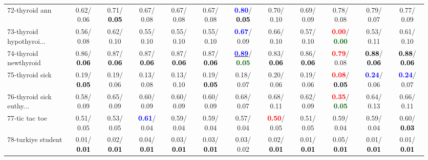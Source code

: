 \begin{table}[h]
\begin{center}
{\begin{tabular}{lc|c|c|c|c|c|c|c|c|c|c}
72-thyroid ann &   0.62/  0.06 &   0.71/\textcolor{black}{\textbf{  0.05}} &   0.67/  0.08 &   0.67/  0.08 &   0.67/  0.08 & \textcolor{blue}{\textbf{  0.80}}/\textcolor{black}{\textbf{  0.05}} &   0.70/  0.10 &   0.69/  0.09 &   0.78/  0.08 &   0.79/  0.07 &   0.77/  0.09 \\
73-thyroid hypothyroi... &   0.56/  0.08 &   0.62/  0.10 &   0.55/  0.10 &   0.55/  0.10 &   0.55/  0.10 & \textcolor{blue}{\textbf{  0.67}}/  0.09 &   0.66/  0.10 &   0.57/  0.10 & \textcolor{red}{\textbf{  0.00}}/\textcolor{darkgreen}{\textbf{  0.00}} &   0.53/  0.11 &   0.61/  0.10 \\
74-thyroid newthyroid &   0.86/\textcolor{black}{\textbf{  0.06}} &   0.87/\textcolor{black}{\textbf{  0.06}} &   0.87/\textcolor{black}{\textbf{  0.06}} &   0.87/\textcolor{black}{\textbf{  0.06}} &   0.87/\textcolor{black}{\textbf{  0.06}} & \underline{\textcolor{blue}{\textbf{  0.89}}}/\textcolor{darkgreen}{\textbf{  0.05}} &   0.83/\textcolor{black}{\textbf{  0.06}} &   0.86/\textcolor{black}{\textbf{  0.06}} & \textcolor{red}{\textbf{  0.79}}/  0.08 & \textcolor{black}{\textbf{  0.88}}/\textcolor{black}{\textbf{  0.06}} & \textcolor{black}{\textbf{  0.88}}/\textcolor{black}{\textbf{  0.06}} \\
75-thyroid sick &   0.19/\textcolor{black}{\textbf{  0.05}} &   0.19/  0.06 &   0.13/  0.08 &   0.13/  0.10 &   0.19/\textcolor{black}{\textbf{  0.05}} &   0.18/  0.07 &   0.20/  0.06 &   0.19/  0.06 & \textcolor{red}{\textbf{  0.08}}/\textcolor{black}{\textbf{  0.05}} & \textcolor{blue}{\textbf{  0.24}}/  0.06 & \textcolor{blue}{\textbf{  0.24}}/  0.07 \\
76-thyroid sick euthy... &   0.58/  0.09 &   0.65/  0.09 &   0.60/  0.09 &   0.60/  0.09 &   0.60/  0.09 &   0.68/  0.07 &   0.68/  0.11 &   0.62/  0.09 & \textcolor{red}{\textbf{  0.35}}/\textcolor{darkgreen}{\textbf{  0.05}} &   0.64/  0.13 &   0.66/  0.11 \\
77-tic tac toe &   0.51/  0.05 &   0.53/  0.05 & \textcolor{blue}{\textbf{  0.61}}/  0.04 &   0.59/  0.04 &   0.59/  0.04 &   0.57/  0.04 & \textcolor{red}{\textbf{  0.50}}/  0.05 &   0.51/  0.05 &   0.59/  0.04 &   0.59/  0.04 &   0.60/\textcolor{black}{\textbf{  0.03}} \\
78-turkiye student &   0.01/\textcolor{black}{\textbf{  0.01}} &   0.02/\textcolor{black}{\textbf{  0.01}} &   0.04/\textcolor{black}{\textbf{  0.01}} &   0.03/\textcolor{black}{\textbf{  0.01}} &   0.03/\textcolor{black}{\textbf{  0.01}} &   0.03/  0.02 &   0.02/\textcolor{black}{\textbf{  0.01}} &   0.01/\textcolor{black}{\textbf{  0.01}} &   0.05/\textcolor{black}{\textbf{  0.01}} &   0.01/\textcolor{black}{\textbf{  0.01}} &   0.01/\textcolor{black}{\textbf{  0.01}} \\ \hline

\end{tabular}}
\end{center}
\end{table}
